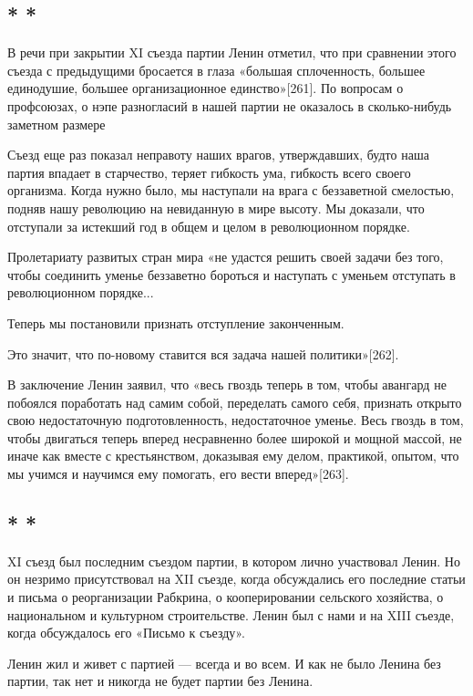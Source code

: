 \documentclass[12pt, a4paper, openany]{book}
\begin{document}
\subsection*{\center * * *}

В речи при закрытии XI съезда партии Ленин отметил, что при сравнении этого съезда с предыдущими бросается в глаза «большая сплоченность, большее единодушие, большее организационное единство»[261]. По вопросам о профсоюзах, о нэпе разногласий в нашей партии не оказалось в сколько-нибудь заметном размере

Съезд еще раз показал неправоту наших врагов, утверждавших, будто наша партия впадает в старчество, теряет гибкость ума, гибкость всего своего организма. Когда нужно было, мы наступали на врага с беззаветной смелостью, подняв нашу революцию на невиданную в мире высоту. Мы доказали, что отступали за истекший год в общем и целом в революционном порядке.

Пролетариату развитых стран мира «не удастся решить своей задачи без того, чтобы соединить уменье беззаветно бороться и наступать с уменьем отступать в революционном порядке...

Теперь мы постановили признать отступление законченным.

Это значит, что по-новому ставится вся задача нашей политики»[262].

В заключение Ленин заявил, что «весь гвоздь теперь в том, чтобы авангард не побоялся поработать над самим собой, переделать самого себя, признать открыто свою недостаточную подготовленность, недостаточное уменье. Весь гвоздь в том, чтобы двигаться теперь вперед несравненно более широкой и мощной массой, не иначе как вместе с крестьянством, доказывая ему делом, практикой, опытом, что мы учимся и научимся ему помогать, его вести вперед»[263].

\subsection*{\center * * *}

XI съезд был последним съездом партии, в котором лично участвовал Ленин. Но он незримо присутствовал на XII съезде, когда обсуждались его последние статьи и письма о реорганизации Рабкрина, о кооперировании сельского хозяйства, о национальном и культурном строительстве. Ленин был с нами и на XIII съезде, когда обсуждалось его «Письмо к съезду».

Ленин жил и живет с партией — всегда и во всем. И как не было Ленина без партии, так нет и никогда не будет партии без Ленина.
\end{document}
